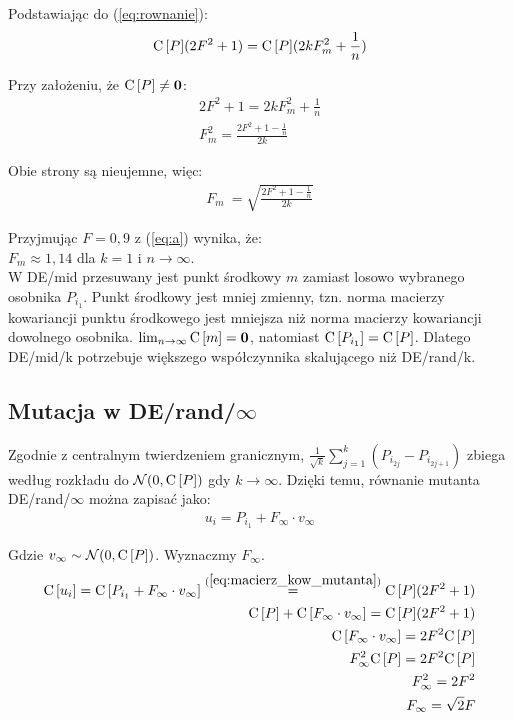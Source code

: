 Podstawiając do (\ref{eq:rownanie}):
\begin{align*}
{\rm C}\,[P](2F^2 + 1) = {\rm C}\,[P](2kF_m^2 + \frac{1}{n})
\end{align*}

Przy założeniu, że ${\rm C}\,[P] \neq \textbf{0}$:
\begin{align*}
2F^2 + 1 = 2kF_m^2 + \frac{1}{n} \\
F_m^2 = \frac{2F^2 + 1 - \frac{1}{n}}{2k}
\end{align*}

Obie strony są nieujemne, więc:
\begin{align} \label{eq:a}
F_m\ = \sqrt{\frac{2F^2 + 1 - \frac{1}{n}}{2k}}
\end{align}

Przyjmując $F=0,9$ z (\ref{eq:a}) wynika, że: \\
$F_m \approx 1,14$ dla $k=1$ i $n\to\infty$. \\

W DE/mid przesuwany jest punkt środkowy $m$ zamiast losowo wybranego osobnika $P_{i_1}$.
Punkt środkowy jest mniej zmienny, 
tzn. norma macierzy kowariancji punktu środkowego jest mniejsza niż norma macierzy kowariancji dowolnego osobnika.
$\lim_{n\to\infty} {\rm C}\,[m] = \textbf{0}$, natomiast ${\rm C}\,[P_{i_1}] = {\rm C}\,[P]$.
Dlatego DE/mid/k potrzebuje większego współczynnika skalującego niż DE/rand/k. \\

\subsection{Mutacja w DE/rand/$\infty$}

Zgodnie z centralnym twierdzeniem granicznym, $\frac{1}{{\sqrt{k}}}\sum\limits_{j=1}^k (P_{i_{2j}} - P_{i_{2j+1}})$ 
zbiega według rozkładu do $\mathcal{N}(0, {\rm C}\,[P])$ gdy $k \to \infty$. 
Dzięki temu, równanie mutanta DE/rand/$\infty$ można zapisać jako:
\begin{align*}
u_i = P_{i_1} + F_\infty \cdot v_\infty
\end{align*}

Gdzie $v_\infty \sim \mathcal{N}(0, {\rm C}\,[P])$. Wyznaczmy $F_\infty$.
\begin{align*}
{\rm C}\,[u_i] = {\rm C}\,[P_{i_1} + F_\infty \cdot v_\infty] \overset{(\ref{eq:macierz_kow_mutanta})}{=} {\rm C}\,[P](2F^2 + 1) \\
{\rm C}\,[P] + {\rm C}\,[F_\infty \cdot v_\infty] = {\rm C}\,[P](2F^2 + 1) \\
{\rm C}\,[F_\infty \cdot v_\infty] = 2F^2{\rm C}\,[P] \\
F_\infty^2 {\rm C}\,[P] = 2F^2{\rm C}\,[P] \\
F_\infty^2 = 2F^2 \\
F_\infty = \sqrt{2}F
\end{align*}

